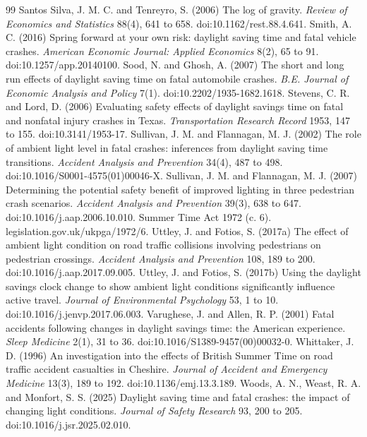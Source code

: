 \documentclass[11pt,a4paper]{article}
\begin{document}
\begin{thebibliography}{99}
 Santos Silva, J. M. C. and Tenreyro, S. (2006) The log of gravity. \textit{Review of Economics and Statistics} 88(4), 641 to 658. doi:10.1162/rest.88.4.641.
 Smith, A. C. (2016) Spring forward at your own risk: daylight saving time and fatal vehicle crashes. \textit{American Economic Journal: Applied Economics} 8(2), 65 to 91. doi:10.1257/app.20140100.
 Sood, N. and Ghosh, A. (2007) The short and long run effects of daylight saving time on fatal automobile crashes. \textit{B.E. Journal of Economic Analysis and Policy} 7(1). doi:10.2202/1935-1682.1618.
 Stevens, C. R. and Lord, D. (2006) Evaluating safety effects of daylight savings time on fatal and nonfatal injury crashes in Texas. \textit{Transportation Research Record} 1953, 147 to 155. doi:10.3141/1953-17.
 Sullivan, J. M. and Flannagan, M. J. (2002) The role of ambient light level in fatal crashes: inferences from daylight saving time transitions. \textit{Accident Analysis and Prevention} 34(4), 487 to 498. doi:10.1016/S0001-4575(01)00046-X.
 Sullivan, J. M. and Flannagan, M. J. (2007) Determining the potential safety benefit of improved lighting in three pedestrian crash scenarios. \textit{Accident Analysis and Prevention} 39(3), 638 to 647. doi:10.1016/j.aap.2006.10.010.
 Summer Time Act 1972 (c. 6). legislation.gov.uk/ukpga/1972/6.
 Uttley, J. and Fotios, S. (2017a) The effect of ambient light condition on road traffic collisions involving pedestrians on pedestrian crossings. \textit{Accident Analysis and Prevention} 108, 189 to 200. doi:10.1016/j.aap.2017.09.005.
 Uttley, J. and Fotios, S. (2017b) Using the daylight savings clock change to show ambient light conditions significantly influence active travel. \textit{Journal of Environmental Psychology} 53, 1 to 10. doi:10.1016/j.jenvp.2017.06.003.
 Varughese, J. and Allen, R. P. (2001) Fatal accidents following changes in daylight savings time: the American experience. \textit{Sleep Medicine} 2(1), 31 to 36. doi:10.1016/S1389-9457(00)00032-0.
 Whittaker, J. D. (1996) An investigation into the effects of British Summer Time on road traffic accident casualties in Cheshire. \textit{Journal of Accident and Emergency Medicine} 13(3), 189 to 192. doi:10.1136/emj.13.3.189.
 Woods, A. N., Weast, R. A. and Monfort, S. S. (2025) Daylight saving time and fatal crashes: the impact of changing light conditions. \textit{Journal of Safety Research} 93, 200 to 205. doi:10.1016/j.jsr.2025.02.010.
\end{thebibliography}
\end{document}
